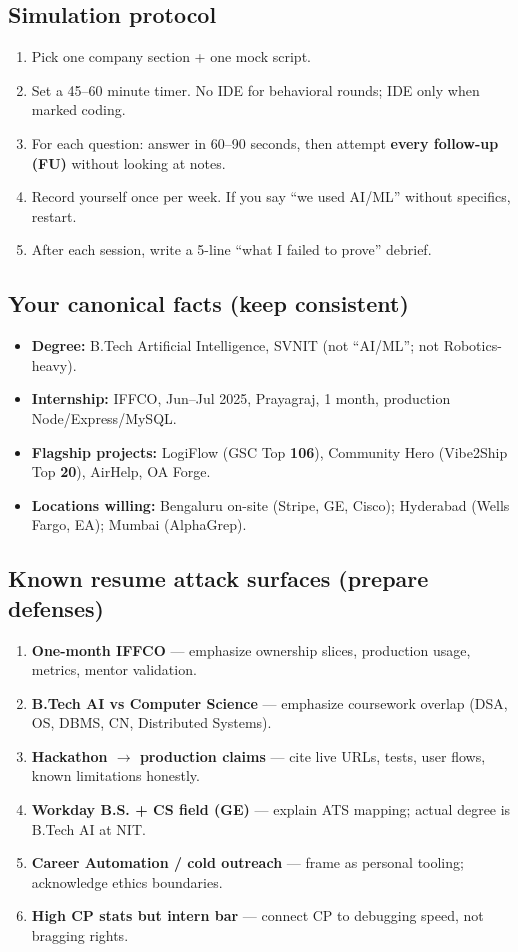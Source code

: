 \documentclass[9pt,a4paper]{article}
\begin{document}
\subsection{Simulation protocol}
\begin{enumerate}
  \item Pick one company section + one mock script.
  \item Set a 45--60 minute timer. No IDE for behavioral rounds; IDE only when marked coding.
  \item For each question: answer in 60--90 seconds, then attempt \textbf{every follow-up (FU)} without looking at notes.
  \item Record yourself once per week. If you say ``we used AI/ML'' without specifics, restart.
  \item After each session, write a 5-line ``what I failed to prove'' debrief.
\end{enumerate}

\subsection{Your canonical facts (keep consistent)}
\begin{itemize}
  \item \textbf{Degree:} B.Tech Artificial Intelligence, SVNIT (not ``AI/ML''; not Robotics-heavy).
  \item \textbf{Internship:} IFFCO, Jun--Jul 2025, Prayagraj, 1 month, production Node/Express/MySQL.
  \item \textbf{Flagship projects:} LogiFlow (GSC Top \textbf{106}), Community Hero (Vibe2Ship Top \textbf{20}), AirHelp, OA Forge.
  \item \textbf{Locations willing:} Bengaluru on-site (Stripe, GE, Cisco); Hyderabad (Wells Fargo, EA); Mumbai (AlphaGrep).
\end{itemize}

\subsection{Known resume attack surfaces (prepare defenses)}
\begin{enumerate}
  \item \textbf{One-month IFFCO} --- emphasize ownership slices, production usage, metrics, mentor validation.
  \item \textbf{B.Tech AI vs Computer Science} --- emphasize coursework overlap (DSA, OS, DBMS, CN, Distributed Systems).
  \item \textbf{Hackathon $\rightarrow$ production claims} --- cite live URLs, tests, user flows, known limitations honestly.
  \item \textbf{Workday B.S. + CS field (GE)} --- explain ATS mapping; actual degree is B.Tech AI at NIT.
  \item \textbf{Career Automation / cold outreach} --- frame as personal tooling; acknowledge ethics boundaries.
  \item \textbf{High CP stats but intern bar} --- connect CP to debugging speed, not bragging rights.
\end{enumerate}
\end{document}
